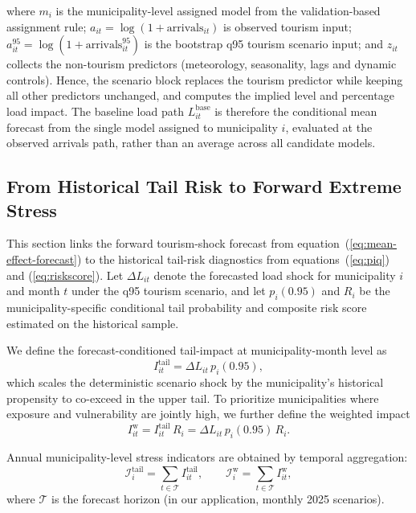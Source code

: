 \documentclass[11pt,a4paper]{article}
\begin{document}
where $m_i$ is the municipality-level assigned model from the validation-based assignment rule; 
$a_{it}=\log(1+\text{arrivals}_{it})$ is observed tourism input; 
$a_{it}^{95}=\log(1+\text{arrivals}_{it}^{95})$ is the bootstrap q95 tourism scenario input; and 
$z_{it}$ collects the non-tourism predictors (meteorology, seasonality, lags and dynamic controls). 
Hence, the scenario block replaces the tourism predictor while keeping all other predictors unchanged, and computes the implied level and percentage load impact. The baseline load path $L_{it}^{\mathrm{base}}$ is therefore the conditional mean forecast from the single model assigned to municipality $i$, evaluated at the observed arrivals path, rather than an average across all candidate models.


\subsection{From Historical Tail Risk to Forward Extreme Stress}

This section links the forward tourism-shock forecast from equation~(\ref{eq:mean-effect-forecast}) to the historical tail-risk diagnostics from equations~(\ref{eq:piq}) and (\ref{eq:riskscore}). Let $\Delta L_{it}$ denote the forecasted load shock for municipality $i$ and month $t$ under the q95 tourism scenario, and let $p_i(0.95)$ and $R_i$ be the municipality-specific conditional tail probability and composite risk score estimated on the historical sample.

We define the forecast-conditioned tail-impact at municipality-month level as
\begin{equation}
\label{eq:scenario-tail-impact}
I_{it}^{\mathrm{tail}} = \Delta L_{it}\, p_i(0.95),
\end{equation}
which scales the deterministic scenario shock by the municipality's historical propensity to co-exceed in the upper tail.
To prioritize municipalities where exposure and vulnerability are jointly high, we further define the weighted impact
\begin{equation}
\label{eq:scenario-tail-impact-weighted}
I_{it}^{\mathrm{w}} = I_{it}^{\mathrm{tail}}\, R_i
= \Delta L_{it}\, p_i(0.95)\, R_i.
\end{equation}

Annual municipality-level stress indicators are obtained by temporal aggregation:
\begin{equation}
\label{eq:scenario-annual-aggregation}
\mathcal{I}_{i}^{\mathrm{tail}} = \sum_{t \in \mathcal{T}} I_{it}^{\mathrm{tail}},
\qquad
\mathcal{I}_{i}^{\mathrm{w}} = \sum_{t \in \mathcal{T}} I_{it}^{\mathrm{w}},
\end{equation}
where $\mathcal{T}$ is the forecast horizon (in our application, monthly 2025 scenarios).
\end{document}

